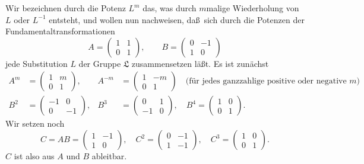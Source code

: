 \documentclass[12pt,a4paper]{article}
\begin{document}
Wir bezeichnen durch die Potenz $L^m$ das, was durch $m$malige Wiederholung von $L$ oder $L^{-1}$ entsteht, und wollen nun nachweisen, da\ss\ sich durch die Potenzen der Fundamentaltransformationen
\begin{equation}\label{eq:30_AB}
A = \begin{pmatrix} 1 & 1 \\ 0 & 1 \end{pmatrix},\qquad B = \begin{pmatrix} 0 & -1 \\ 1 & 0 \end{pmatrix}
\end{equation}
jede Substitution $L$ der Gruppe $\mathfrak{L}$ zusammensetzen l\"a\ss t. Es ist zun\"achst
\begin{align}
A^m &= \begin{pmatrix} 1 & m \\ 0 & 1 \end{pmatrix},& A^{-m} &= \begin{pmatrix} 1 & -m \\ 0 & 1 \end{pmatrix}\quad\text{(f\"ur jedes ganzzahlige positive oder negative $m$)} \label{eq:30_3}\\
B^2 &= \begin{pmatrix} -1 & 0 \\ 0 & -1 \end{pmatrix},& B^3 &= \begin{pmatrix} 0 & 1 \\ -1 & 0 \end{pmatrix},\quad B^4 = \begin{pmatrix} 1 & 0 \\ 0 & 1 \end{pmatrix}. \label{eq:30_4}
\end{align}
Wir setzen noch
\begin{equation}\label{eq:30_C}
C = AB = \begin{pmatrix} 1 & -1 \\ 1 & 0 \end{pmatrix},\quad C^2 = \begin{pmatrix} 0 & -1 \\ 1 & -1 \end{pmatrix},\quad C^3 = \begin{pmatrix} 1 & 0 \\ 0 & 1 \end{pmatrix}.
\end{equation}
$C$ ist also aus $A$ und $B$ ableitbar.
\end{document}
